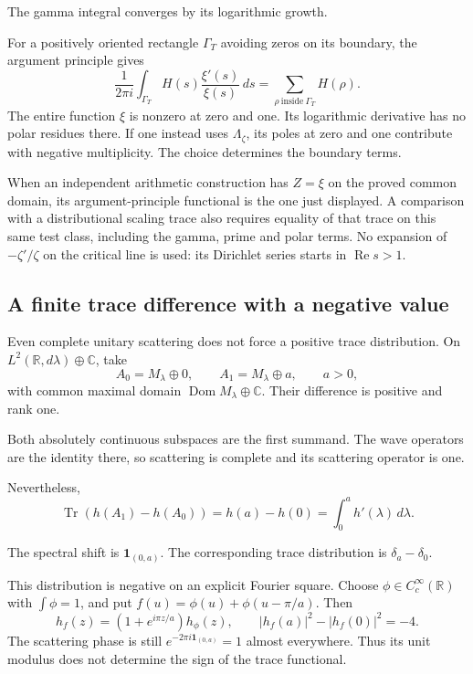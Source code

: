 The gamma integral converges by its logarithmic growth.

For a positively oriented rectangle $\Gamma_T$ avoiding zeros on its
boundary, the argument principle gives
\[
 \frac1{2\pi i}
    \int_{\Gamma_T}H(s)\frac{\xi'(s)}{\xi(s)}\,ds
   =\sum_{\rho\ \mathrm{inside}\ \Gamma_T}H(\rho).
\]
The entire function $\xi$ is nonzero at zero and one. Its logarithmic
derivative has no polar residues there. If one instead uses $\Lambda_\zeta$,
its poles at zero and one contribute with negative multiplicity. The choice
determines the boundary terms.

When an independent arithmetic construction has $Z=\xi$ on the proved common
domain, its argument-principle functional is the one just displayed. A
comparison with a distributional scaling trace also requires equality of
that trace on this same test class, including the gamma, prime and polar
terms. No expansion of $-\zeta'/\zeta$ on the critical line is used: its
Dirichlet series starts in $\operatorname{Re}s>1$.

\subsection{A finite trace difference with a negative value}

Even complete unitary scattering does not force a positive trace
distribution. On $L^2(\mathbb R,d\lambda)\oplus\mathbb C$, take
\[
 A_0=M_\lambda\oplus0,\qquad
 A_1=M_\lambda\oplus a,\qquad a>0,
\]
with common maximal domain $\operatorname{Dom}M_\lambda\oplus\mathbb C$.
Their difference is positive and rank one.

Both absolutely continuous subspaces are the first summand. The wave
operators are the identity there, so scattering is complete and its
scattering operator is one.

Nevertheless,
\[
 \operatorname{Tr}(h(A_1)-h(A_0))
       =h(a)-h(0)
       =\int_0^a h'(\lambda)\,d\lambda.
\]

The spectral shift is $\mathbf1_{(0,a)}$. The corresponding trace
distribution is $\delta_a-\delta_0$.

This distribution is negative on an explicit Fourier square. Choose $\phi\in
C_c^\infty(\mathbb R)$ with $\int\phi=1$, and put
$f(u)=\phi(u)+\phi(u-\pi/a)$. Then
\[
 h_f(z)=(1+e^{i\pi z/a})h_\phi(z),\qquad
 |h_f(a)|^2-|h_f(0)|^2=-4.
\]
The scattering phase is still $e^{-2\pi i\mathbf1_{(0,a)}}=1$ almost
everywhere. Thus its unit modulus does not determine the sign of the trace
functional.


